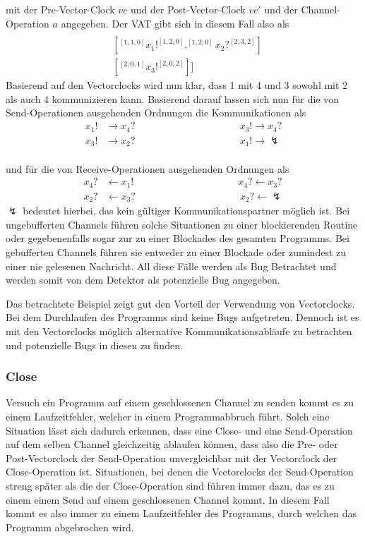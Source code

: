 mit der Pre-Vector-Clock $vc$ und der 
Post-Vector-Clock $vc'$ und der Channel-Operation $a$ angegeben.
Der VAT gibt sich in diesem Fall also als
\begin{align*}
  [&[^{[2,0,0]}x_4?^{[3,2,0]}]\\
  &[^{[1, 1, 0]}x_1!^{[1, 2, 0]}, ^{[1, 2, 0]}x_2?^{[2, 3, 2]}]\\
  &[^{[2, 0, 1]}x_3!^{[2, 0, 2]}]]
\end{align*}
Basierend auf den Vectorclocks wird nun klar, dass 1 mit 4 und 3 sowohl mit 
2 als auch 4 kommunizieren kann. Basierend darauf lassen sich nun für die 
von Send-Operationen ausgehenden Ordnungen die Kommunikationen als
  \begin{align*}
    x_1! &\to x_4? \phantom{aaaaaaaaaaaaaaaaaaaa} x_3! \to x_4?\\
    x_3! &\to x_2? \phantom{aaaaaaaaaaaaaaaaaaaa} x_1! \to \lightning
  \end{align*}\\
und für die von Receive-Operationen ausgehenden Ordnungen als
  \begin{align*}
    x_4? &\leftarrow x_1! \phantom{aaaaaaaaaaaaaaaaaaaa} x_4? \leftarrow x_3?\\
    x_2? &\leftarrow x_3? \phantom{aaaaaaaaaaaaaaaaaaaa} x_2? \leftarrow \lightning
  \end{align*}
$\lightning$ bedeutet hierbei, das kein gültiger Kommunikationspartner möglich ist.
Bei ungebufferten Channels führen solche Situationen zu einer blockierenden Routine
oder gegebenenfalls sogar zur zu einer Blockades des gesamten Programms.
Bei gebufferten Channels führen sie entweder zu einer Blockade oder zumindest 
zu einer nie gelesenen Nachricht. All diese Fälle werden als Bug Betrachtet
und werden somit von dem Detektor als potenzielle Bug angegeben.

Das betrachtete Beispiel zeigt gut den Vorteil der Verwendung von Vectorclocks.
Bei dem Durchlaufen des Programms sind keine Bugs aufgetreten. Dennoch 
ist es mit den Vectorclocks möglich alternative Kommunikationsabläufe 
zu betrachten und potenzielle Bugs in diesen zu finden.  

\subsubsection{Close}
Versuch ein Programm auf einem geschlossenen Channel zu senden kommt es zu einem Laufzeitfehler, 
welcher in einem Programmabbruch führt. Solch eine Situation lässt sich 
dadurch erkennen, dass eine Close- und eine Send-Operation auf dem selben Channel
gleichzeitig ablaufen können, dass also die Pre- oder Post-Vectorclock 
der Send-Operation unvergleichbar mit der Vectorclock der Close-Operation 
ist. Situationen, bei denen die Vectorclocks der Send-Operation streng später 
als die der Close-Operation sind führen immer dazu, das es zu einem einem 
Send auf einem geschlossenen Channel kommt. In diesem Fall kommt es also immer 
zu einem Laufzeitfehler des Programms, durch welchen das Programm abgebrochen wird.

